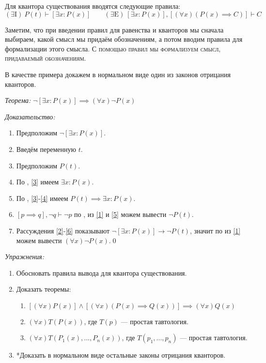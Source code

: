 Для квантора существования вводятся следующие правила:
\[
	(\exists\text{I})~ P(t)\vdash [\exists x:P(x)]\qquad
	(\exists\text{E})~ [\exists x:P(x)],[(\forall x)(P(x)\implies C)]\vdash C
\]

Заметим, что при введении правил для равенства и кванторов мы
сначала выбираем, какой смысл мы придаём обозначениям, а потом вводим
правила для формализации этого смысла.
\textsc{С помощью правил мы формализуем смысл, придаваемый обозначениям.}

В качестве примера докажем в нормальном виде один из законов отрицания кванторов.

{\it Теорема:} $\lnot [\exists x:P(x)]\implies  (\forall x)\lnot P(x)$

{\it Доказательство:}
\begin{enumerate}[label=(\arabic*)]
	\item{}\label{1}Предположим $\lnot [\exists x:P(x)]$.
	\item{}\label{2}Введём переменную $t$.
	\item{}\label{3}Предположим $P(t)$.
	\item{}\label{4}По \Eii{}, \ref{3} имеем $\exists x:P(x)$.
	\item{}\label{5}По \implic{}, \ref{3}-\ref{4} имеем $P(t)\implies \exists x:P(x)$.
	\item{}\label{6}${[p\implies q],\lnot q\vdash \lnot p}$ по \taut{}, из
	\ref{1} и \ref{5} можем вывести $\lnot P(t)$.
	\item{}\label{7}Рассуждения \ref{2}-\ref{6} показывают
	$\lnot[\exists x:P(x)]\to\lnot P(t)$, значит по \Aii{} из \ref{1} можем
	вывести $(\forall x)\lnot P(x)$.\qed
\end{enumerate}

{\it Упражнения:}
\begin{enumerate}
	\item{}Обосновать правила вывода для квантора существования.
	\item{}Доказать теоремы:
	\begin{enumerate}
		\item{}$[(\forall x)P(x)]\land[(\forall x)(P(x)\implies Q(x))]
			\implies (\forall x)Q(x)$\label{thm:obv_forall}
		\item{}$(\forall x)T(P(x))$, где $T(p)$ --- простая тавтология.\label{thm:obv_taut}
		\item{}$(\forall x)T(P_1(x),...,P_{n}(x))$, где $T(p_1,...,p_{n})$ ---
		простая тавтология.
	\end{enumerate}
	\item{}*Доказать в нормальном виде остальные законы отрицания кванторов.
\end{enumerate}

